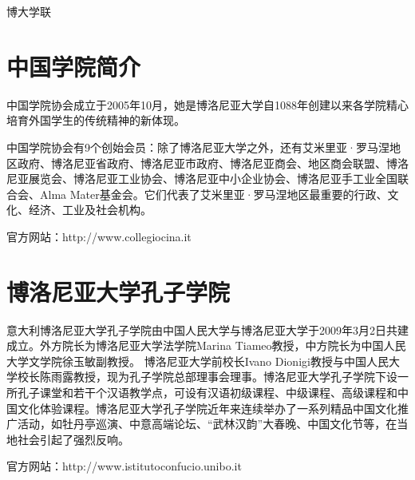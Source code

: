 博大学联




\section{中国学院简介}

         中国学院协会成立于2005年10月，她是博洛尼亚大学自1088年创建以来各学院精心培育外国学生的传统精神的新体现。

          中国学院协会有9个创始会员：除了博洛尼亚大学之外，还有艾米里亚·罗马涅地区政府、博洛尼亚省政府、博洛尼亚市政府、博洛尼亚商会、地区商会联盟、博洛尼亚展览会、博洛尼亚工业协会、博洛尼亚中小企业协会、博洛尼亚手工业全国联合会、Alma Mater基金会。它们代表了艾米里亚·罗马涅地区最重要的行政、文化、经济、工业及社会机构。


官方网站：http://www.collegiocina.it

\section{博洛尼亚大学孔子学院}

意大利博洛尼亚大学孔子学院由中国人民大学与博洛尼亚大学于2009年3月2日共建成立。外方院长为博洛尼亚大学法学院Marina Tiameo教授，中方院长为中国人民大学文学院徐玉敏副教授。 博洛尼亚大学前校长Ivano Dionigi教授与中国人民大学校长陈雨露教授，现为孔子学院总部理事会理事。博洛尼亚大学孔子学院下设一所孔子课堂和若干个汉语教学点，可设有汉语初级课程、中级课程、高级课程和中国文化体验课程。博洛尼亚大学孔子学院近年来连续举办了一系列精品中国文化推广活动，如牡丹亭巡演、中意高端论坛、“武林汉韵”大春晚、中国文化节等，在当地社会引起了强烈反响。

官方网站：http://www.istitutoconfucio.unibo.it
